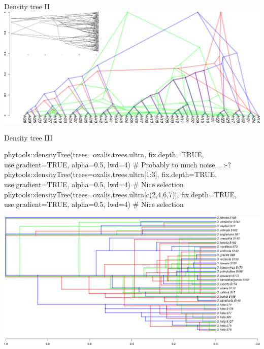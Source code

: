 \documentclass[compress, ucs, xelatex, 11pt, xcolor=svgnames,
	hyperref={
		bookmarks=true,
		unicode=true,
		colorlinks=true,
		pdftitle={Molecular data in R},
		plainpages=false,
		pdfauthor={Vojtech Zeisek},
		pdfsubject={Course about phylogeny and evolution in R},
		pdfcreator={XeLaTeX},
		pdfkeywords={R, evolution, phylogeny, molecular data},
		linkcolor=Tomato,
		anchorcolor=SaddleBrown,
		citecolor=Goldenrod,
		filecolor=DarkMagenta,
		menucolor=Sienna,
		urlcolor=DarkTurquoise,
		pdftex},
	url={hyphens, lowtilde} %
	]{beamer}
\begin{document}
\begin{frame}[fragile]{Density tree II}
	\includegraphics[width=\textwidth]{oxalis_density_phangorn.png}
\end{frame}

\begin{frame}[fragile]{Density tree III}
	\begin{spluscode}
    phytools::densityTree(trees=oxalis.trees.ultra, fix.depth=TRUE,
      use.gradient=TRUE, alpha=0.5, lwd=4) # Probably to much noise... :-?
    phytools::densityTree(trees=oxalis.trees.ultra[1:3], fix.depth=TRUE,
      use.gradient=TRUE, alpha=0.5, lwd=4) # Nice selection
    phytools::densityTree(trees=oxalis.trees.ultra[c(2,4,6,7)],
      fix.depth=TRUE, use.gradient=TRUE, alpha=0.5, lwd=4) # Nice selection
	\end{spluscode}
	\begin{center}
		\includegraphics[width=\textwidth-2.75cm]{oxalis_density_phytools.png}
	\end{center}
\end{frame}

%
\end{document}
